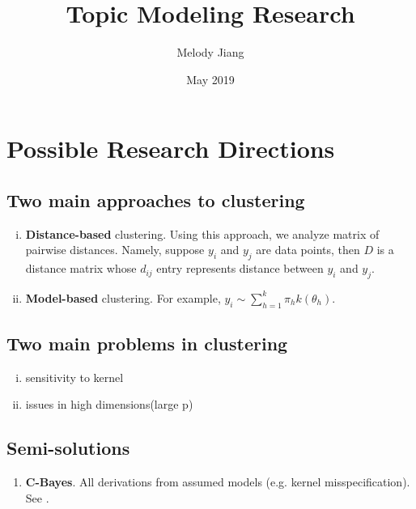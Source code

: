 \documentclass{article}
\title{Topic Modeling Research}
\author{Melody Jiang}
\date{May 2019}
\begin{document}
\maketitle

\section{Possible Research Directions}

\subsection{Two main approaches to clustering}

\begin{enumerate}[(i)]
  \item \textbf{Distance-based} clustering. Using this approach, we analyze matrix of pairwise distances. Namely, suppose $y_i$ and $y_j$ are data points, then $D$ is a distance matrix whose $d_{ij}$ entry represents distance between $y_i$ and $y_j$.
  \item \textbf{Model-based} clustering. For example, $y_i \sim \sum_{h = 1}^k \pi_h k(\theta_h)$.
\end{enumerate}

\subsection{Two main problems in clustering}

\begin{enumerate}[(i)]
  \item sensitivity to kernel
  \item issues in high dimensions(large p)
\end{enumerate}

\subsection{Semi-solutions}

\begin{enumerate}
  \item \textbf{C-Bayes}. All derivations from assumed models (e.g. kernel misspecification). See \cite{miller2018robust}.
\end{enumerate}






\end{document}

